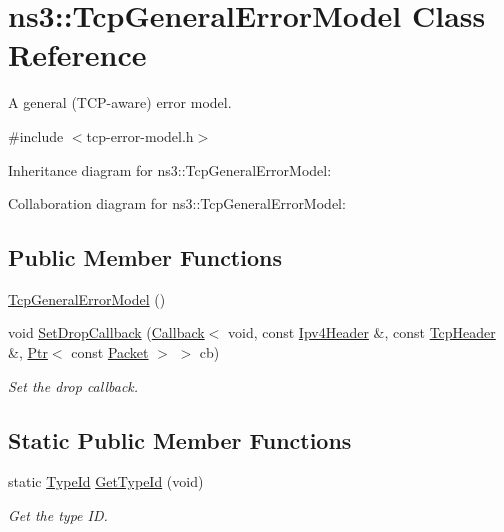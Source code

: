 \hypertarget{classns3_1_1TcpGeneralErrorModel}{}\section{ns3\+:\+:Tcp\+General\+Error\+Model Class Reference}
\label{classns3_1_1TcpGeneralErrorModel}


A general (T\+C\+P-\/aware) error model.  




{\ttfamily \#include $<$tcp-\/error-\/model.\+h$>$}



Inheritance diagram for ns3\+:\+:Tcp\+General\+Error\+Model\+:


Collaboration diagram for ns3\+:\+:Tcp\+General\+Error\+Model\+:
\subsection*{Public Member Functions}
\begin{DoxyCompactItemize}
\item 
\hyperlink{classns3_1_1TcpGeneralErrorModel_abd916457dd21c03bc4154a4782bea17d}{Tcp\+General\+Error\+Model} ()
\item 
void \hyperlink{classns3_1_1TcpGeneralErrorModel_a812f8d0b0eaf4508efd44be00028673f}{Set\+Drop\+Callback} (\hyperlink{classns3_1_1Callback}{Callback}$<$ void, const \hyperlink{classns3_1_1Ipv4Header}{Ipv4\+Header} \&, const \hyperlink{classns3_1_1TcpHeader}{Tcp\+Header} \&, \hyperlink{classns3_1_1Ptr}{Ptr}$<$ const \hyperlink{classns3_1_1Packet}{Packet} $>$ $>$ cb)
\begin{DoxyCompactList}\small\item\em Set the drop callback. \end{DoxyCompactList}\end{DoxyCompactItemize}
\subsection*{Static Public Member Functions}
\begin{DoxyCompactItemize}
\item 
static \hyperlink{classns3_1_1TypeId}{Type\+Id} \hyperlink{classns3_1_1TcpGeneralErrorModel_a361bdf6f195a14d8861417a1fa39fc7b}{Get\+Type\+Id} (void)
\begin{DoxyCompactList}\small\item\em Get the type ID. \end{DoxyCompactList}\end{DoxyCompactItemize}
